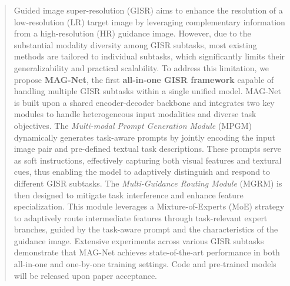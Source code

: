 \documentclass[lettersize,journal]{IEEEtran}
\begin{document}
\begin{abstract}
Guided image super-resolution (GISR) aims to enhance the resolution of a low-resolution (LR) target image by leveraging complementary information from a high-resolution (HR) guidance image. However, due to the substantial modality diversity among GISR subtasks, most existing methods are tailored to individual subtasks, which significantly limits their generalizability and practical scalability. 
To address this limitation, we propose \textbf{MAG-Net}, the first \textbf{all-in-one GISR framework} capable of handling multiple GISR subtasks within a single unified model. 
MAG-Net is built upon a shared encoder-decoder backbone and integrates two key modules to handle heterogeneous input modalities and diverse task objectives.
The \textit{Multi-modal Prompt Generation Module} (MPGM) dynamically generates task-aware prompts by jointly encoding the input image pair and pre-defined textual task descriptions. These prompts serve as soft instructions, effectively capturing both visual features and textural cues, thus enabling the model to adaptively distinguish and respond to different GISR subtasks. 
The \textit{Multi-Guidance Routing Module} (MGRM) is then designed to mitigate task interference and enhance feature specialization. This module leverages a Mixture-of-Experts (MoE) strategy to adaptively route intermediate features through task-relevant expert branches, guided by the task-aware prompt and the characteristics of the guidance image. Extensive experiments across various GISR subtasks demonstrate that MAG-Net achieves state-of-the-art performance in both all-in-one and one-by-one training settings. %
Code and pre-trained models will be released upon paper acceptance.


\end{abstract}
\end{document}
